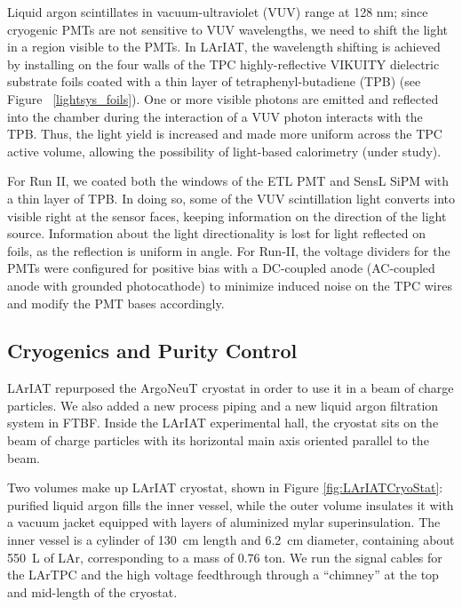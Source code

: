 Liquid argon scintillates in vacuum-ultraviolet (VUV) range at 128 nm; since cryogenic PMTs are not sensitive to VUV wavelengths, we need to shift the light in a region visible to the PMTs. In LArIAT, the wavelength shifting is achieved by installing on the four walls of the TPC highly-reflective VIKUITY dielectric substrate foils coated with a thin layer of tetraphenyl-butadiene (TPB) (see Figure ~\ref{lightsys_foils}). One or more visible photons  are emitted and reflected into the chamber during the interaction of a VUV photon interacts with the TPB. Thus, the light yield is increased and made more uniform across the TPC active volume, allowing the possibility of light-based calorimetry (under study).


For Run II, we coated both  the windows of the ETL PMT and SensL SiPM  with a thin layer of TPB. In doing so, some of the VUV scintillation light converts into visible right at the sensor faces, keeping information on the direction of the light source. Information about the light directionality is lost for light reflected on foils, as the reflection is uniform in angle. For Run-II, the voltage dividers for the PMTs were configured for positive bias with a DC-coupled anode (AC-coupled anode with grounded photocathode) to minimize induced noise on the TPC wires and modify the PMT bases accordingly.  


\subsection{Cryogenics and Purity Control}\label{ch:Cryo}
LArIAT repurposed the ArgoNeuT cryostat \cite{argoneut} in order to use it in a beam of charge particles. We also added a new process piping and a new liquid argon filtration system in FTBF.
Inside the LArIAT experimental hall, the cryostat sits on the beam of charge particles with its horizontal main axis oriented parallel to the beam.

Two volumes make up LArIAT cryostat, shown in Figure \ref{fig:LArIATCryoStat}: purified liquid argon fills the inner vessel, while the outer volume insulates it with a vacuum jacket equipped with layers of aluminized mylar superinsulation. The inner vessel is a cylinder of 130~cm length and 6.2~cm diameter, containing about 550~L of LAr, corresponding to a mass of 0.76 ton. We run the signal cables for the LArTPC and the high voltage feedthrough through a ``chimney'' at the top and mid-length of the cryostat.


